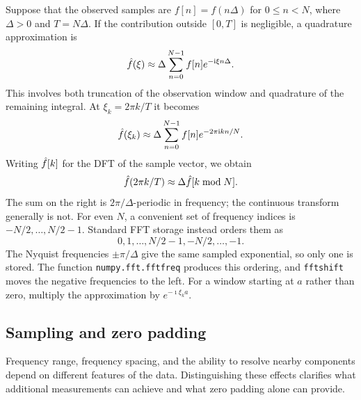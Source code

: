 Suppose that the observed samples are $f[n]=f(n\Delta)$ for $0\leq n<N$,
where $\Delta>0$ and $T=N\Delta$. If the contribution outside $[0,T]$
is negligible, a quadrature approximation is
\[
 \hat{f}(\xi)\approx\Delta\sum_{n=0}^{N-1}f[n]e^{-\mathrm{i}\xi n\Delta}.
\]
This involves both truncation of the observation window and quadrature of
the remaining integral. At $\xi_k=2\pi k/T$ it becomes
\begin{equation}
\label{eq-approx-transforme-fourier-dft-1}
 \hat{f}(\xi_k)\approx\Delta\sum_{n=0}^{N-1}f[n]e^{-2\pi\mathrm{i} kn/N}.
\end{equation}
Writing $\hat{f}[k]$ for the DFT of the sample vector, we obtain
\begin{equation}
\label{eq-approx-transforme-fourier-dft}
 \hat{f}(2\pi k/T)\approx\Delta\hat{f}[k\bmod N].
\end{equation}
The sum on the right is $2\pi/\Delta$-periodic in frequency; the continuous
transform generally is not. For even $N$, a convenient set of frequency
indices is $-N/2,\ldots,N/2-1$. Standard FFT storage instead orders them as
\[
 0,1,\ldots,N/2-1,-N/2,\ldots,-1.
\]
The Nyquist frequencies $\pm\pi/\Delta$ give the same sampled exponential,
so only one is stored. The function \texttt{numpy.fft.fftfreq} produces this
ordering, and \texttt{fftshift} moves the negative frequencies to the left.
For a window starting at $a$ rather than zero, multiply the approximation
by $e^{-\imath\xi_k a}$.

\subsection{Sampling and zero padding}
\label{sect2-addition-zeros}

Frequency range, frequency spacing, and the ability to resolve nearby
components depend on different features of the data. Distinguishing these
effects clarifies what additional measurements can achieve and what zero
padding alone can provide.

